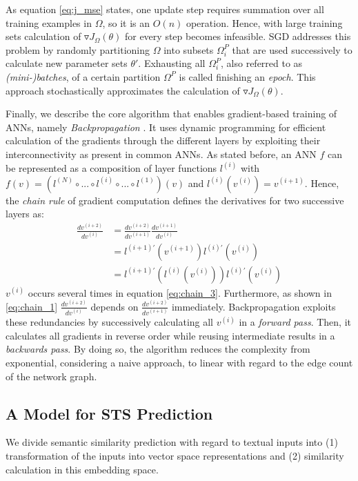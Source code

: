 As equation \eqref{eq:j_mse} states, one update step requires summation over all training examples in $\Omega$, so it is an $O(n)$ operation. %
Hence, with large training sets calculation of $\triangledown J_\Omega(\theta)$ for every step becomes infeasible. \ac{SGD}  addresses this problem by randomly partitioning $\Omega$ into subsets $\Omega^P_i$ %
that are used successively to calculate new parameter sets $\theta'$. Exhausting all $\Omega^P_i$, also referred to as \textit{(mini-)batches}, of a certain partition $\Omega^P$ is called finishing an \textit{epoch}. This approach stochastically approximates the calculation of $\triangledown J_\Omega(\theta)$.

Finally, we describe the core algorithm that enables gradient-based training of \ac{ANN}s, namely \textit{Backpropagation} \autocite{rumelhart_learning_1988}. It uses dynamic programming for efficient calculation of the gradients through the different layers by exploiting their interconnectivity as present in common \ac{ANN}s. As stated before, an \ac{ANN} $f$ can be represented as a composition of layer functions $l^{(i)}$ with $f(v) = (l^{(N)} \circ ... \circ l^{(i)} \circ ... \circ l^{(1)})(v)$ and $l^{(i)}(v^{(i)}) = v^{(i+1)}$. Hence, the \textit{chain rule} of gradient computation defines the derivatives for two successive layers as:  
\begin{align}
  \frac{dv^{(i+2)}}{dv^{(i)}} & = \frac{dv^{(i+2)}}{dv^{(i+1)}}\frac{dv^{(i+1)}}{dv^{(i)}} \label{eq:chain_1}\\
    & = l^{(i+1)'}(v^{(i+1)})l^{(i)'}(v^{(i)}) \label{eq:chain_2}\\
    & = l^{(i+1)'}(l^{(i)}(v^{(i)}))l^{(i)'}(v^{(i)})  \label{eq:chain_3}
\end{align}
$v^{(i)}$ occurs several times in equation \eqref{eq:chain_3}. Furthermore, as shown in \eqref{eq:chain_1} $\frac{dv^{(i+2)}}{dv^{(i)}}$ depends on $\frac{dv^{(i+2)}}{dv^{(i+1)}}$ immediately. Backpropagation exploits these redundancies by successively calculating all $v^{(i)}$ in a \textit{forward pass}. Then, it calculates all gradients in reverse order while reusing intermediate results in a \textit{backwards pass}. By doing so, the algorithm reduces the complexity from exponential, considering a naive approach, to linear with regard to the edge count of the network graph.

\subsection{A Model for STS Prediction}
We divide semantic similarity prediction with regard to textual inputs into (1) transformation of the inputs into vector space representations and 
(2) similarity calculation in this embedding space.

